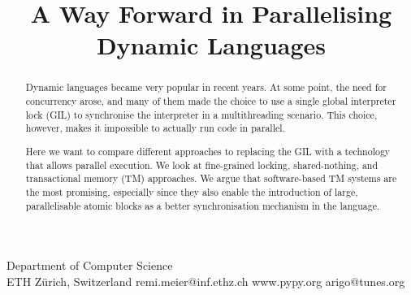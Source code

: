 \documentclass{sigplanconf}
\begin{document}
\setlength{\pdfpageheight}{\paperheight}
\setlength{\pdfpagewidth}{\paperwidth}






\title{A Way Forward in Parallelising Dynamic Languages}

           {Department of Computer Science\\ ETH Zürich, Switzerland}
           {remi.meier@inf.ethz.ch}
           {www.pypy.org}
           {arigo@tunes.org}

\maketitle

\begin{abstract}
  Dynamic languages became very popular in recent years. At some
  point, the need for concurrency arose, and many of them made the
  choice to use a single global interpreter lock (GIL) to synchronise
  the interpreter in a multithreading scenario. This choice, however,
  makes it impossible to actually run code in parallel.

  Here we want to compare different approaches to replacing the GIL
  with a technology that allows parallel execution. We look at
  fine-grained locking, shared-nothing, and transactional memory (TM)
  approaches. We argue that software-based TM systems are the most
  promising, especially since they also enable the introduction of
  large, parallelisable atomic blocks as a better synchronisation
  mechanism in the language.
\end{abstract}
\end{document}
